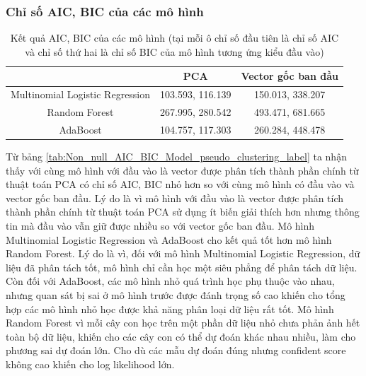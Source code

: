 \subsubsection{Chỉ số AIC, BIC của các mô hình}


\begin{table}[h!]
    \centering
    \begin{tabular}{|c|c|c|}
        \hline
        & PCA & Vector gốc ban đầu \\
        \hline
        Multinomial Logistic Regression & 103.593, 116.139 & 150.013, 338.207 \\
        \hline
        Random Forest & 267.995, 280.542 & 493.471, 681.665\\
        \hline
        AdaBoost & 104.757, 117.303 & 260.284, 448.478 \\
        \hline
    \end{tabular}
    \caption{Kết quả AIC, BIC của các mô hình (tại mỗi ô chỉ số đầu tiên là chỉ số AIC và chỉ số thứ hai là chỉ số BIC của mô hình tương ứng kiểu đầu vào)}
    \label{tab:With_null_AIC_BIC_Model_pseudo_clustering_label}
\end{table}


Từ bảng \ref{tab:Non_null_AIC_BIC_Model_pseudo_clustering_label} ta nhận thấy với cùng mô hình với đầu vào là vector được phân tích thành phần chính từ thuật toán PCA có chỉ số AIC, BIC nhỏ hơn so với cùng mô hình có đầu vào và vector gốc ban đầu.
Lý do là vì mô hình với đầu vào là vector được phân tích thành phần chính từ thuật toán PCA sử dụng ít biến giải thích hơn nhưng thông tin mà đầu vào vẫn giữ được nhiều so với vector gốc ban đầu.
Mô hình Multinomial Logistic Regression và AdaBoost cho kết quả tốt hơn mô hình Random Forest.
Lý do là vì, đối với mô hình Multinomial Logistic Regression, dữ liệu đã phân tách tốt, mô hình chỉ cần học một siêu phẳng để phân tách dữ liệu.
Còn đối với AdaBoost, các mô hình nhỏ quá trình học phụ thuộc vào nhau, nhưng quan sát bị sai ở mô hình trước được đánh trọng số cao khiến cho tổng hợp các mô hình nhỏ học được khả năng phân loại dữ liệu rất tốt.
Mô hình Random Forest vì mỗi cây con học trên một phần dữ liệu nhỏ chưa phản ảnh hết toàn bộ dữ liệu, khiến cho các cây con có thể dự đoán khác nhau nhiều, làm cho phương sai dự đoán lớn.
Cho dù các mẫu dự đoán đúng nhưng confident score không cao khiến cho log likelihood lớn.
